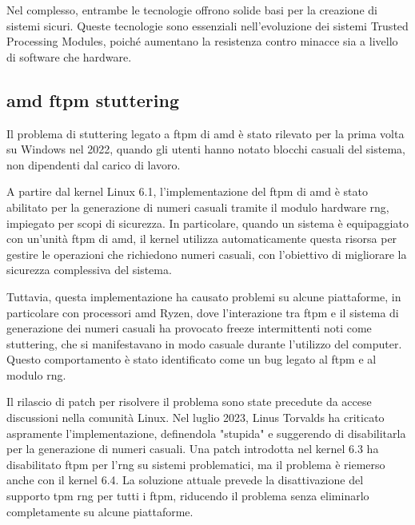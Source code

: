 Nel complesso, entrambe le tecnologie offrono solide basi per la creazione di sistemi sicuri. Queste tecnologie sono essenziali nell'evoluzione dei sistemi Trusted Processing Modules, poiché aumentano la resistenza contro minacce sia a livello di software che hardware.

\subsection{\texorpdfstring{\acrshort{amd} \acrshort{ftpm} stuttering}{AMD fTPM stuttering}}\label{subsec:amd_ftpm_stuttering}

Il problema di stuttering legato a \acrshort{ftpm} di \acrshort{amd} è stato rilevato per la prima volta su Windows nel 2022, quando gli utenti hanno notato blocchi casuali del sistema, non dipendenti dal carico di lavoro.

A partire dal kernel Linux 6.1, l'implementazione del \acrshort{ftpm} di \acrshort{amd} è stato abilitato per la generazione di numeri casuali tramite il modulo hardware \acrshort{rng}, impiegato per scopi di sicurezza. In particolare, quando un sistema è equipaggiato con un'unità \acrshort{ftpm} di \acrshort{amd}, il kernel utilizza automaticamente questa risorsa per gestire le operazioni che richiedono numeri casuali, con l'obiettivo di migliorare la sicurezza complessiva del sistema.

Tuttavia, questa implementazione ha causato problemi su alcune piattaforme, in particolare con processori \acrshort{amd} Ryzen, dove l’interazione tra \acrshort{ftpm} e il sistema di generazione dei numeri casuali ha provocato freeze intermittenti noti come stuttering, che si manifestavano in modo casuale durante l'utilizzo del computer. Questo comportamento è stato identificato come un bug legato al \acrshort{ftpm} e al modulo \acrshort{rng}.

Il rilascio di patch per risolvere il problema sono state precedute da accese discussioni nella comunità Linux. Nel luglio 2023, Linus Torvalds ha criticato aspramente l'implementazione, definendola "stupida" e suggerendo di disabilitarla per la generazione di numeri casuali. Una patch introdotta nel kernel 6.3 ha disabilitato \acrshort{ftpm} per l'\acrshort{rng} su sistemi problematici, ma il problema è riemerso anche con il kernel 6.4. La soluzione attuale prevede la disattivazione del supporto \acrshort{tpm} \acrshort{rng} per tutti i \acrshort{ftpm}, riducendo il problema senza eliminarlo completamente su alcune piattaforme.

